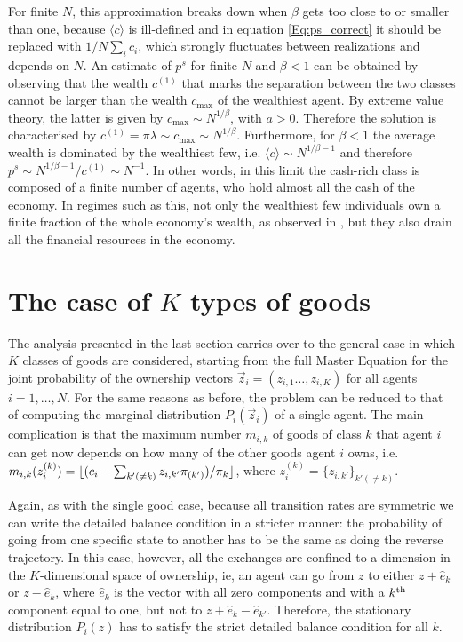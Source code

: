 For finite $N$, this approximation breaks down when $\beta$ gets too close to or smaller than one, because $\langle c \rangle$ is ill-defined and in equation \eqref{Eq:ps_correct} it should be replaced with $1/N \sum_i c_i $, which strongly fluctuates between realizations and depends on $N$. An estimate of $p^s$ for finite $N$ and $\beta<1$ can be obtained by observing that the wealth $c^{(1)}$ that marks the separation between the two classes cannot be larger than the wealth $c_{\max}$ of the wealthiest agent. By extreme value theory, the latter is given by $c_{\max}\sim N^{1/\beta}$, with $a>0$. Therefore the solution is characterised by $ c^{(1)}=\pi \lambda\sim c_{\max}\sim N^{1/\beta}$. Furthermore, for $\beta<1$ the average wealth is dominated by the wealthiest few, i.e. $\langle c \rangle \sim N^{1/\beta-1}$ and therefore  $p^s \sim N^{1/\beta-1}/c^{(1)} \sim N^{-1}$. In other words, in this limit the cash-rich class is composed of a finite number of agents, who hold almost all the cash of the economy. In regimes such as this, not only the wealthiest few individuals own a finite fraction of the whole economy's wealth, as observed in \cite{Bouchaud2000}, but they also drain all the financial resources in the economy.


\section{The case of $K$ types of goods}

The analysis presented in the last section carries over to the general case in which $K$ classes of goods are considered, starting from the full Master Equation for the joint probability of the ownership vectors $\vec z_i=(z_{i,1}\ldots, z_{i,K})$ for all agents $i=1,\ldots,N$. For the same reasons as before, the problem can be reduced to that of computing the marginal distribution $P_i(\vec z_i)$ of a single agent. The main complication is that the maximum number $m_{i,k}$ of goods of class $k$ that agent $i$ can get now depends on how many of the other goods agent $i$ owns, i.e. $m_{i,k}(z^{(k)}_i)=\lfloor(c_i-\sum_{k'(\neq k)} z_{i,k'} \pi_{(k')})/\pi_{{k}}\rfloor$, where $z^{(k)}_i=\{z_{i,{k'}}\}_{k'(\neq k)}$. 

Again, as with the single good case, because all transition rates are symmetric we can write the detailed balance condition in a stricter manner: the probability of going from one specific state to another has to be the same as doing the reverse trajectory. In this case, however, all the exchanges are confined to a dimension in the $K$-dimensional space of ownership, ie, an agent can go from $z$ to either $z + \hat e_k$ or $z - \hat e_k$, where $\hat e_k$ is the vector with all zero components and with a $k^{\rm th}$ component equal to one, but not to $z + \hat e_k - \hat e_{k'}$. Therefore, the stationary distribution $P_i (z)$ has to satisfy the strict detailed balance condition for all $k$.

